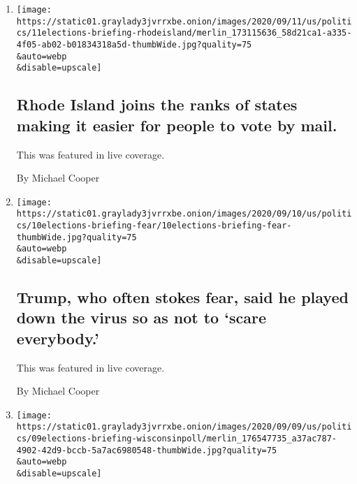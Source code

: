\begin{enumerate}
\def\labelenumi{\arabic{enumi}.}
\item
  \href{/live/2020/09/11/us/trump-vs-biden/rhode-island-joins-the-ranks-of-states-making-it-easier-for-people-to-vote-by-mail}{}

  \texttt{[image: https://static01.graylady3jvrrxbe.onion/images/2020/09/11/us/politics/11elections-briefing-rhodeisland/merlin\_173115636\_58d21ca1-a335-4f05-ab02-b01834318a5d-thumbWide.jpg?quality=75\\\&auto=webp\\\&disable=upscale]}

  \hypertarget{rhode-island-joins-the-ranks-of-states-making-it-easier-for-people-to-vote-by-mail}{%
  \subsection{Rhode Island joins the ranks of states making it easier
  for people to vote by
  mail.}\label{rhode-island-joins-the-ranks-of-states-making-it-easier-for-people-to-vote-by-mail}}

  This was featured in live coverage.

  By Michael Cooper
\item
  \href{/live/2020/09/10/us/trump-vs-biden/trump-who-often-stokes-fear-said-he-played-down-the-virus-so-as-not-to-scare-everybody}{}

  \texttt{[image: https://static01.graylady3jvrrxbe.onion/images/2020/09/10/us/politics/10elections-briefing-fear/10elections-briefing-fear-thumbWide.jpg?quality=75\\\&auto=webp\\\&disable=upscale]}

  \hypertarget{trump-who-often-stokes-fear-said-he-played-down-the-virus-so-as-not-to-scare-everybody}{%
  \subsection{Trump, who often stokes fear, said he played down the
  virus so as not to `scare
  everybody.'}\label{trump-who-often-stokes-fear-said-he-played-down-the-virus-so-as-not-to-scare-everybody}}

  This was featured in live coverage.

  By Michael Cooper
\item
  \href{/live/2020/09/09/us/trump-vs-biden/polls-show-biden-maintaining-a-narrow-edge-in-wisconsin-and-holding-a-lead-in-pennsylvania}{}

  \texttt{[image: https://static01.graylady3jvrrxbe.onion/images/2020/09/09/us/politics/09elections-briefing-wisconsinpoll/merlin\_176547735\_a37ac787-4902-42d9-bccb-5a7ac6980548-thumbWide.jpg?quality=75\\\&auto=webp\\\&disable=upscale]}


\end{enumerate}
